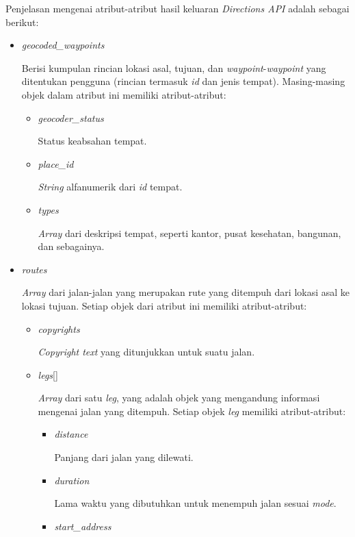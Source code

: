 Penjelasan mengenai atribut-atribut hasil keluaran \textit{Directions API} adalah sebagai berikut:

\begin{itemize}
	\item \textit{geocoded\_waypoints}
	
	Berisi kumpulan rincian lokasi asal, tujuan, dan \textit{waypoint}-\textit{waypoint} yang ditentukan pengguna (rincian termasuk \textit{id} dan jenis tempat). Masing-masing objek dalam atribut ini memiliki atribut-atribut:
	
	\begin{itemize}
		\item \textit{geocoder\_status}
		
		Status keabsahan tempat. 
		\item \textit{place\_id}
		
		\textit{String} alfanumerik dari \textit{id} tempat.
		\item \textit{types}
		
		\textit{Array} dari deskripsi tempat, seperti kantor, pusat kesehatan, bangunan, dan sebagainya. 
	\end{itemize}
	\item \textit{routes}
	
	\textit{Array} dari jalan-jalan yang merupakan rute yang ditempuh dari lokasi asal ke lokasi tujuan. Setiap objek dari atribut ini memiliki atribut-atribut:
	
	\begin{itemize}
		
		\item \textit{copyrights}
		
		\textit{Copyright text} yang ditunjukkan untuk suatu jalan.
		\item \textit{legs}[]
		
		\textit{Array} dari satu \textit{leg}, yang adalah objek yang mengandung informasi mengenai jalan yang ditempuh. Setiap objek \textit{leg} memiliki atribut-atribut:
		
		\begin{itemize}
			\item \textit{distance}
			
			Panjang dari jalan yang dilewati.
			\item \textit{duration}
			
			Lama waktu yang dibutuhkan untuk menempuh jalan sesuai \textit{mode}.
			\item \textit{start\_address}
			

\end{itemize}
\end{itemize}
\end{itemize}
